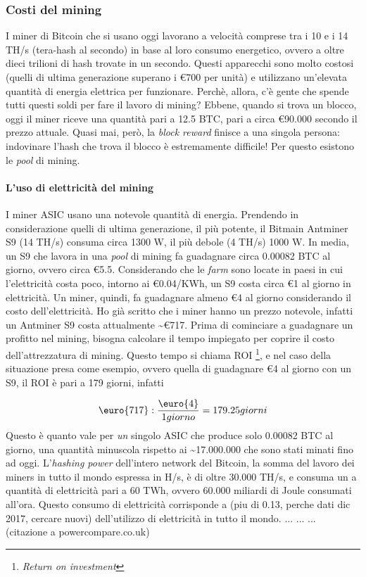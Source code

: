 \documentclass {article}
\begin{document}
\subsubsection {Costi del mining}

I miner di Bitcoin che si usano oggi lavorano a velocità comprese tra i 10 e i 14 TH/s (tera-hash al secondo) in base al loro consumo energetico, ovvero a oltre dieci trilioni di hash trovate in un secondo.
Questi apparecchi sono molto costosi (quelli di ultima generazione superano i \euro{700} per unità) e utilizzano un'elevata quantità di energia elettrica per funzionare.
Perchè, allora, c'è gente che spende tutti questi soldi per fare il lavoro di mining?
Ebbene, quando si trova un blocco, oggi il miner riceve una quantità pari a 12.5 BTC, pari a circa \euro{90.000} secondo il prezzo attuale.
Quasi mai, però, la \textit{block reward} finisce a una singola persona: indovinare l'hash che trova il blocco è estremamente difficile!
Per questo esistono le \textit{pool} di mining.

\paragraph {L'uso di elettricità del mining}

I miner ASIC usano una notevole quantità di energia. Prendendo in considerazione quelli di ultima generazione, il più potente, il Bitmain Antminer S9 (14 TH/s) consuma circa 1300 W, il più debole (4 TH/s) 1000 W.
In media, un S9 che lavora in una \textit{pool} di mining fa guadagnare circa 0.00082 BTC al giorno, ovvero circa \euro{5.5}.
Considerando che le \textit{farm} sono locate in paesi in cui l'elettricità costa poco, intorno ai \euro{0.04}/KWh, un S9 costa circa \euro{1} al giorno in elettricità.
Un miner, quindi, fa guadagnare almeno \euro{4} al giorno considerando il costo dell'elettricità.
Ho già scritto che i miner hanno un prezzo notevole, infatti un Antminer S9 costa attualmente \textasciitilde \euro{717}.
Prima di cominciare a guadagnare un profitto nel mining, bisogna calcolare il tempo impiegato per coprire il costo dell'attrezzatura di mining.
Questo tempo si chiama ROI \footnote{\textit{Return on investment}}, e nel caso della situazione presa come esempio, ovvero quella di guadagnare \euro{4} al giorno con un S9, il ROI è pari a 179 giorni, infatti

$$\textup{\euro{717}} : \frac{\textup{\euro{4}}}{1 giorno} = 179.25 giorni$$
%
Questo è quanto vale per \emph{un} singolo ASIC che produce solo 0.00082 BTC al giorno, una quantità minuscola rispetto ai \textasciitilde 17.000.000 che sono stati minati fino ad oggi.
L'\textit{hashing power} dell'intero network del Bitcoin, la somma del lavoro dei miners in tutto il mondo espressa in H/s, è di oltre 30.000 TH/s, e consuma un a quantità di elettricità pari a 60 TWh, ovvero 60.000 miliardi di Joule consumati all'ora.
Questo consumo di elettricità corrisponde a (piu di 0.13, perche dati dic 2017, cercare nuovi) dell'utilizzo di elettricità in tutto il mondo.
... ... ... (citazione a powercompare.co.uk)
\end{document}
